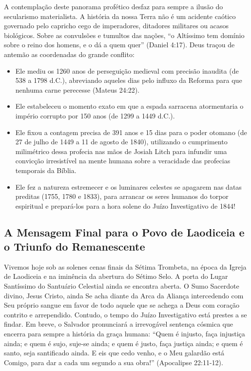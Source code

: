 \documentclass[11pt,a4paper,openany]{book}
\begin{document}
A contemplação deste panorama profético desfaz para sempre a ilusão do secularismo materialista. A história da nossa Terra não é um acidente caótico governado pelo capricho cego de imperadores, ditadores militares ou acasos biológicos. Sobre as convulsões e tumultos das nações, ``o Altíssimo tem domínio sobre o reino dos homens, e o dá a quem quer'' (Daniel 4:17).
Deus traçou de antemão as coordenadas do grande conflito:
\begin{itemize}
  \item Ele mediu os 1260 anos de perseguição medieval com precisão inaudita (de 538 a 1798 d.C.), abreviando aqueles dias pelo influxo da Reforma para que nenhuma carne perecesse (Mateus 24:22).
  \item Ele estabeleceu o momento exato em que a espada sarracena atormentaria o império corrupto por 150 anos (de 1299 a 1449 d.C.).
  \item Ele fixou a contagem precisa de 391 anos e 15 dias para o poder otomano (de 27 de julho de 1449 a 11 de agosto de 1840), utilizando o cumprimento milimétrico dessa profecia nas mãos de Josiah Litch para infundir uma convicção irresistível na mente humana sobre a veracidade das profecias temporais da Bíblia.
  \item Ele fez a natureza estremecer e os luminares celestes se apagarem nas datas preditas (1755, 1780 e 1833), para arrancar os seres humanos do torpor espiritual e prepará-los para a hora solene do Juízo Investigativo de 1844!
\end{itemize}




\subsection{A Mensagem Final para o Povo de Laodiceia e o Triunfo do Remanescente}


Vivemos hoje sob as solenes cenas finais da Sétima Trombeta, na época da Igreja de Laodiceia e na iminência da abertura do Sétimo Selo.
A porta do Lugar Santíssimo do Santuário Celestial ainda se encontra aberta. O Sumo Sacerdote divino, Jesus Cristo, ainda Se acha diante da Arca da Aliança intercedendo com Seu próprio sangue em favor de todo aquele que se achega a Deus com coração contrito e arrependido.
Contudo, o tempo do Juízo Investigativo está prestes a se findar. Em breve, o Salvador pronunciará a irrevogável sentença cósmica que encerra para sempre a história da graça humana:
``Quem é injusto, faça injustiça ainda; e quem é sujo, suje-se ainda; e quem é justo, faça justiça ainda; e quem é santo, seja santificado ainda. E eis que cedo venho, e o Meu galardão está Comigo, para dar a cada um segundo a sua obra!'' (Apocalipse 22:11-12).
\end{document}
